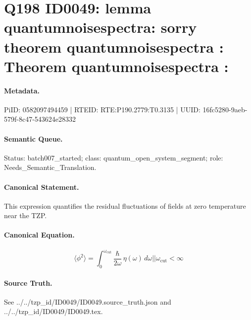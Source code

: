 \section*{Q198 ID0049: lemma quantumnoisespectra: sorry theorem quantumnoisespectra : Theorem quantumnoisespectra :}
\paragraph{Metadata.}
PiID: 0582097494459 | RTEID: RTE:P190.2779:T0.3135 | UUID: 16fc5280-9aeb-579f-8c47-543624e28332

\paragraph{Semantic Queue.}
Status: batch007\_started; class: quantum\_open\_system\_segment; role: Needs\_Semantic\_Translation.

\paragraph{Canonical Statement.}
This expression quantifies the residual fluctuations of fields at zero temperature near the TZP.

\paragraph{Canonical Equation.}
\[
\langle \phi^{2} \rangle = \int_{0}^{\omega_{\mathrm{cut}}} \frac{\hbar}{2\omega}\, \eta(\omega)\,d\omega || \omega_{\mathrm{cut}} < \infty
\]

\paragraph{Source Truth.}
See ../../tzp\_id/ID0049/ID0049.source\_truth.json and ../../tzp\_id/ID0049/ID0049.tex.

